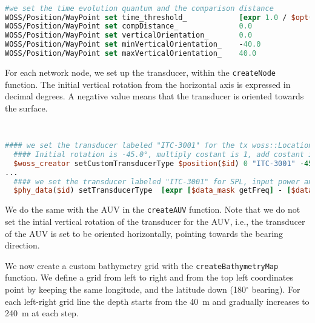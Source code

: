 \documentclass[11pt]{article}
\begin{document}
{\scriptsize\tt
\begin{lstlisting}[language=tcl,showstringspaces=false]
#we set the time evolution quantum and the comparison distance
WOSS/Position/WayPoint set time_threshold_            [expr 1.0 / $opt(speed)]
WOSS/Position/WayPoint set compDistance_              0.0
WOSS/Position/WayPoint set verticalOrientation_       0.0
WOSS/Position/WayPoint set minVerticalOrientation_    -40.0
WOSS/Position/WayPoint set maxVerticalOrientation_    40.0
\end{lstlisting}
}
\vspace{\baselinestretch\baselineskip}

For each network node, we set up the transducer, within the {\tt createNode} function.
The initial vertical rotation from the horizontal axis is expressed in decimal degrees. 
A negative value means that the transducer is oriented towards the surface.

{\scriptsize\tt
\begin{lstlisting}[language=tcl,showstringspaces=false]
  #### we set the transducer labeled "ITC-3001" for the tx woss::Location and for all rx woss::Locations.
  #### Initial rotation is -45.0°, multiply costant is 1, add costant is 0
  $woss_creator setCustomTransducerType $position($id) 0 "ITC-3001" -45.0 0.0 1.0 0.0
...
  #### we set the transducer labeled "ITC-3001" for SPL, input power and energy consumpion computations
  $phy_data($id) setTransducerType  [expr [$data_mask getFreq] - [$data_mask getBandwidth] / 2.0 ] [expr [$data_mask getFreq] + [$data_mask getBandwidth] / 2.0 ] "ITC-3001"
\end{lstlisting}
}
\vspace{\baselinestretch\baselineskip}

We do the same with the AUV in the {\tt createAUV} function.
Note that we do not set the intial vertical rotation of the transducer for the AUV, i.e., 
the transducer of the AUV is set to be oriented horizontally, pointing towards the bearing direction.

We now create a custom bathymetry grid with the {\tt createBathymetryMap} function.
We define a grid from left to right and from the top left coordinates point by keeping the same longitude, 
and the latitude down (180$^\circ$ bearing). 
For each left-right grid line the depth starts from the 40~m and gradually increases to 240~m at each step. 
\end{document}
